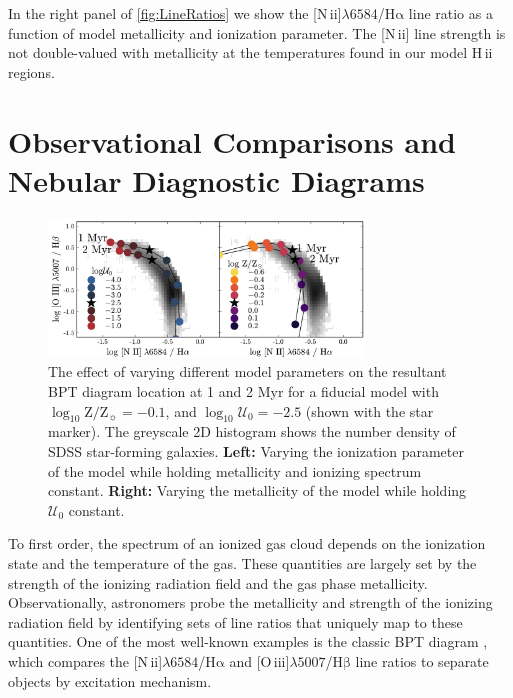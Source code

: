 \documentclass[linenumbers, trackchanges, tighten]{aastex61}%
\newcommand{\Fig}[1]{\autoref{fig:#1}}
\newcommand{\logten}{\ensuremath{\log_{10}}}
\newcommand{\nii}{[N\,{\sc ii}]\xspace}
\newcommand{\oiii}{[O\,{\sc iii}]\xspace}
\newcommand{\ha}{\ensuremath{\mathrm{H\alpha}}}
\newcommand{\hb}{\ensuremath{\mathrm{H\beta}}}
\newcommand{\hii}{H\,{\sc ii}\xspace}
\newcommand\lam[1]{\ensuremath{\lambda #1}}
\newcommand{\logZeq}[1]{\ensuremath{\logten \mathrm{Z}/\mathrm{Z}_{\sun} = #1}}
\newcommand{\U}{\ensuremath{\mathcal{U}_{0}}}
\newcommand{\logU}{\ensuremath{\logten \mathcal{U}_0}}
\newcommand\niiha{\nii{}\lam{6584}/\ha{}}
\newcommand\oiiihb{\oiii{}\lam{5007}/\hb{}}
\begin{document}
In the right panel of \Fig{LineRatios} we show the \niiha{} line ratio as a function of model metallicity and ionization parameter. The \nii{} line strength is not double-valued with metallicity at the temperatures found in our model \hii regions.

\section{Observational Comparisons and Nebular Diagnostic Diagrams} \label{sec:models:diagnostics}

\begin{figure}[!htbp]
    \begin{centering}
        \includegraphics[width=0.75\textwidth]{f16.pdf}
        \caption{The effect of varying different model parameters on the resultant BPT diagram location at 1 and 2 Myr for a fiducial model with \logZeq{-0.1}, and $\logU = -2.5$ (shown with the star marker). The greyscale 2D histogram shows the number density of SDSS star-forming galaxies. \textbf{Left:} Varying the ionization parameter of the model while holding metallicity and ionizing spectrum constant. \textbf{Right:} Varying the metallicity of the model while holding \U{} constant.}
        \label{fig:BPTintro}
    \end{centering}
\end{figure}


To first order, the spectrum of an ionized gas cloud depends on the ionization state and the temperature of the gas. These quantities are largely set by the strength of the ionizing radiation field and the gas phase metallicity. Observationally, astronomers probe the metallicity and strength of the ionizing radiation field by identifying sets of line ratios that uniquely  map to these quantities. One of the most well-known examples is the classic BPT diagram \citep{BPT}, which compares the \niiha{} and \oiiihb{} line ratios to separate objects by excitation mechanism.
\end{document}
